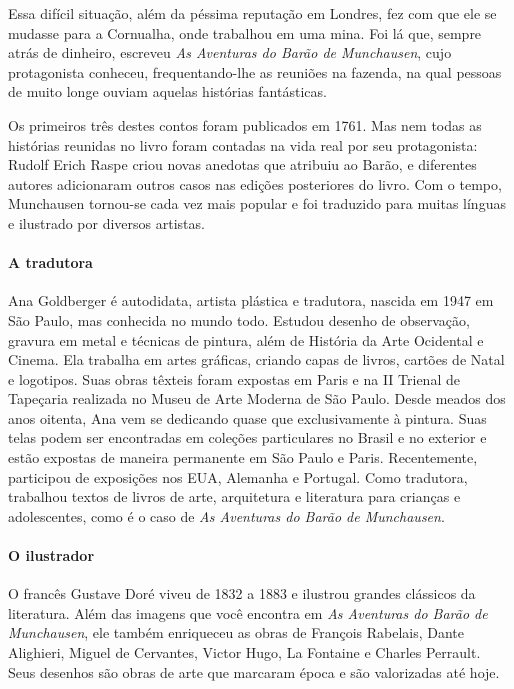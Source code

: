 \documentclass[11pt]{extarticle}
\begin{document}
Essa difícil situação, além da péssima reputação em Londres, fez com que ele se mudasse para a Cornualha, onde trabalhou em uma mina. Foi lá que, sempre atrás de dinheiro, escreveu \textit{As Aventuras do Barão de Munchausen}, cujo protagonista conheceu, frequentando-lhe as reuniões na fazenda, na qual pessoas de muito longe ouviam aquelas histórias fantásticas. 

Os primeiros três destes contos foram publicados em 1761. Mas nem todas as histórias reunidas no livro foram contadas na vida real por seu protagonista: Rudolf Erich Raspe criou novas anedotas que atribuiu ao Barão, e diferentes autores adicionaram outros casos nas edições posteriores do livro. Com o tempo, Munchausen tornou-se cada vez mais popular e foi traduzido para muitas línguas e ilustrado por diversos artistas.


\paragraph{A tradutora}
Ana Goldberger é autodidata, artista plástica e tradutora, nascida em 1947 em São Paulo, mas conhecida no mundo todo. Estudou desenho de observação, gravura em metal e técnicas de pintura, além de História da Arte Ocidental e Cinema. Ela trabalha em artes gráficas, criando capas de livros, cartões de Natal e logotipos. Suas obras têxteis foram expostas em Paris e na II Trienal de Tapeçaria realizada no Museu de Arte Moderna de São Paulo. Desde meados dos anos oitenta, Ana vem se dedicando quase que exclusivamente à pintura. Suas telas podem ser encontradas em coleções particulares no Brasil e no exterior e estão expostas de maneira permanente em São Paulo e Paris. Recentemente, participou de exposições nos EUA, Alemanha e Portugal. Como tradutora, trabalhou textos de livros de arte, arquitetura e literatura para crianças e adolescentes, como é o caso de \textit{As Aventuras do Barão de Munchausen}.

\paragraph{O ilustrador}

O francês Gustave Doré viveu de 1832 a 1883 e ilustrou grandes clássicos da literatura. Além das imagens que você encontra em \textit{As Aventuras do Barão de Munchausen}, ele também enriqueceu as obras de François Rabelais, Dante Alighieri, Miguel de Cervantes, Victor Hugo, La Fontaine e Charles Perrault. Seus desenhos são obras de arte que marcaram época e são valorizadas até hoje. 
\end{document}
